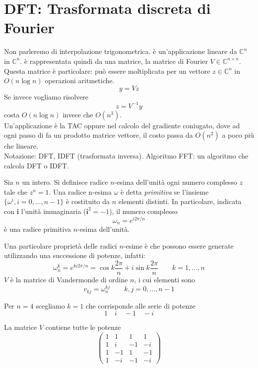 

\inbpdocument 


\chapter{DFT: Trasformata discreta di Fourier}
Non parleremo di interpolazione trigonometrica. \`e un'applicazione
lineare da $\mathbb{C}^{n}$ in $\mathbb{C}^{n}$.  \`e rappresentata
quindi da una matrice, la matrice di Fourier $V \in \mathbb{C}^{n
\times n}$. Questa matrice \`e particolare: può essere
moltiplicata per un vettore $z \in \mathbb{C}^{n}$ in $O(n \log n)$
operazioni aritmetiche.
$$ y = Vz$$
Se invece vogliamo risolvere
$$z = V^{-1}y$$
costa $O(n \log n)$ invece che $O(n^3)$. \\
Un'applicazione \`e la TAC oppure nel calcolo del gradiente coniugato,
dove ad ogni passo di fa un prodotto matrice vettore, il costo passa
da $O(n^2)$ a poco più che lineare.\\ 
Notazione: DFT, IDFT (trasformata inversa). Algoritmo FFT: un algoritmo che
calcola DFT o IDFT.


\begin{defn}
Sia $n$ un intero. Si definisce radice $n$-esima dell'unit\`a
ogni numero complesso $z$ tale che $z^{n} = 1$. Una radice n-esima $\omega$ \`e detta
\emph{primitiva} se l'insieme $\{\omega^{i} , i = 0, \ldots , n-1\}$ \`e costituito da 
$n$ elementi distinti. In particolare, indicata con $\mathbf{i}$ l’unit\`a immaginaria ($\mathbf{i}^2 = −1$),
 il numero complesso
$$\omega_n= e^{i 2\pi/n}$$
\`e una radice primitiva $n$-esima dell'unit\`a.
\end{defn}

Una particolare propriet\`a delle radici $n$-esime \`e che possono
essere generate utilizzando una successione di potenze, infatti:
$$
\omega^{k}_{n} = e^{ki 2\pi / n} = \cos k \frac{2\pi}{n} + i \sin k
\frac{2\pi}{n} \qquad k=1, \ldots, n
$$
$V$ \`e la matrice di Vandermonde di ordine $n$, i cui elementi sono
$$ v_{kj} = \omega_{n}^{kj} \qquad k,j = 0, \ldots, n-1 $$


\begin{example}
Per $n = 4$ scegliamo $k=1$ che corrisponde alle serie di potenze
$$ 1 \quad i \quad -1 \quad -i $$

La matrice $V$ contiene tutte le potenze
$$
\begin{pmatrix}
  1 & 1 & 1 & 1 \\
  1 & i & -1 & - i  \\
  1 & -1 & 1 & -1 \\
  1 & -i & -1 & - i
\end{pmatrix}
$$
\end{example}


